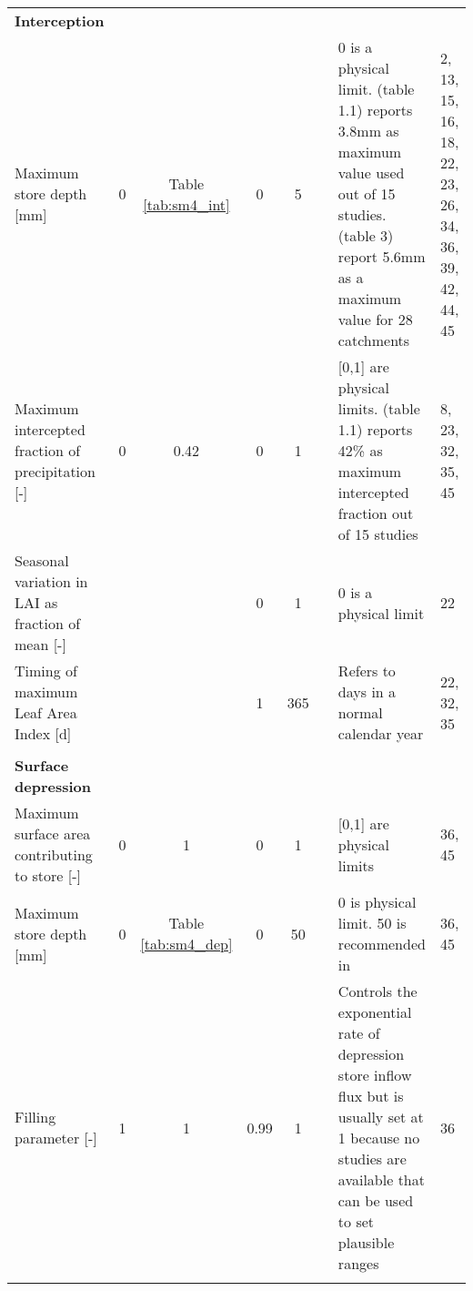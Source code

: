 \begin{longtable}{p{11.215em}ccccp{13em}p{13em}l}
	\textbf{Interception} &       &       &       &       & \multicolumn{1}{l}{} & \multicolumn{1}{l}{} &  \\
    Maximum store depth [mm] & 0     & \multicolumn{1}{p{3.785em}}{Table \ref{tab:sm4_int}} & 0     & 5     & \cite{Chiew1994,Gerrits2010} & 0 is a physical limit. \cite{Gerrits2010} (table 1.1) reports 3.8mm as maximum value used out of 15 studies. \cite{Chiew1994} (table 3) report 5.6mm as a maximum value for 28 catchments  & \multicolumn{1}{p{10em}}{2, 13, 15, 16, 18, 22, 23, 26, 34, 36, 39, 42, 44, 45} \\
    Maximum intercepted fraction of precipitation [-] & 0     & 0.42  & 0     & 1     & \cite{Gerrits2010} & [0,1] are physical limits. \cite{Gerrits2010} (table 1.1) reports 42\% as maximum intercepted fraction out of 15 studies & \multicolumn{1}{p{10em}}{8, 23, 32, 35, 45} \\
    Seasonal variation in LAI as fraction of mean [-] &       &       & 0     & 1     & \multicolumn{1}{l}{} & 0 is a physical limit & 22 \\
    Timing of maximum Leaf Area Index [d] &       &       & 1     & 365   & \multicolumn{1}{l}{} & Refers to days in a normal calendar year & \multicolumn{1}{p{10em}}{22, 32, 35} \\
    \multicolumn{1}{l}{} &       &       &       &       & \multicolumn{1}{l}{} & \multicolumn{1}{l}{} &  \\

\textbf{Surface depression} &       &       &       &       & \multicolumn{1}{l}{} & \multicolumn{1}{l}{} &  \\
    Maximum surface area contributing to store [-] & 0     & 1     & 0     & 1     & \multicolumn{1}{l}{} & [0,1] are physical limits & \multicolumn{1}{p{10em}}{36, 45} \\
    Maximum store depth [mm] & 0     & \multicolumn{1}{p{3.785em}}{Table \ref{tab:sm4_dep}} & 0     & 50    & \cite{Chiew1994} & 0 is physical limit. 50 is recommended in \cite{Chiew1994} & \multicolumn{1}{p{10em}}{36, 45} \\
    Filling parameter [-] & 1     & 1     & 0.99  & 1     & \cite{Chiew1990,Porter1971} & Controls the exponential rate of depression store inflow flux but is usually set at 1 because no studies are available that can be used to set plausible ranges  & 36 \\
    \multicolumn{1}{l}{} &       &       &       &       & \multicolumn{1}{l}{} & \multicolumn{1}{l}{} &  \\


\end{longtable}
